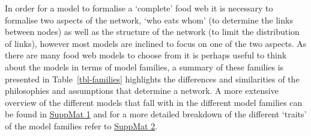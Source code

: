 \documentclass[
]{article}
\begin{document}
In order for a model to formalise a `complete' food web it is necessary
to formalise two aspects of the network, `who eats whom' (to determine
the links between nodes) as well as the structure of the network (to
limit the distribution of links), however most models are inclined to
focus on one of the two aspects. As there are many food web models to
choose from it is perhaps useful to think about the models in terms of
model families, a summary of these families is presented in
Table~\ref{tbl-families} highlights the differences and similarities of
the philosophies and assumptions that determine a network. A more
extensive overview of the different models that fall with in the
different model families can be found in
\href{https://beckslab.github.io/ms_t_is_for_topology/notebooks/model_descriptions-preview.html}{SuppMat
1} and for a more detailed breakdown of the different `traits' of the
model families refer to
\href{https://beckslab.github.io/ms_t_is_for_topology/notebooks/model_qualitative-preview.html}{SuppMat
2}.
\end{document}
